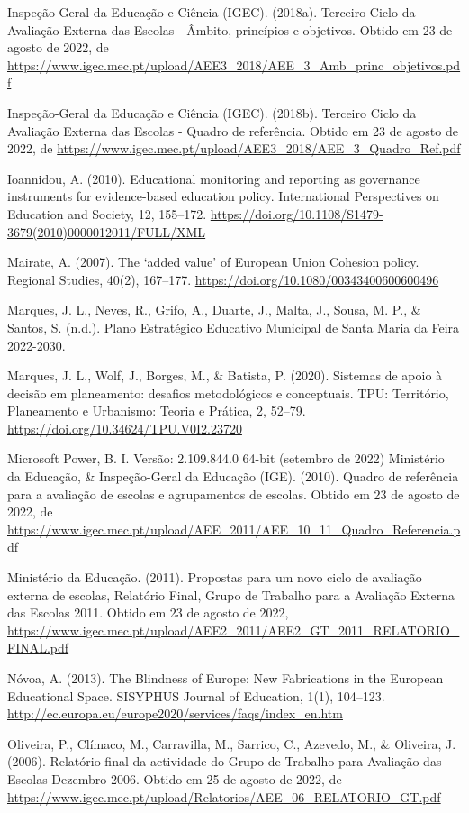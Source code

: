 \documentclass[
]{book}
\begin{document}
Inspeção-Geral da Educação e Ciência (IGEC). (2018a). Terceiro Ciclo da Avaliação Externa das Escolas - Âmbito, princípios e objetivos. Obtido em 23 de agosto de 2022, de \url{https://www.igec.mec.pt/upload/AEE3_2018/AEE_3_Amb_princ_objetivos.pdf}

Inspeção-Geral da Educação e Ciência (IGEC). (2018b). Terceiro Ciclo da Avaliação Externa das Escolas - Quadro de referência. Obtido em 23 de agosto de 2022, de \url{https://www.igec.mec.pt/upload/AEE3_2018/AEE_3_Quadro_Ref.pdf}

Ioannidou, A. (2010). Educational monitoring and reporting as governance instruments for evidence-based education policy. International Perspectives on Education and Society, 12, 155--172. \url{https://doi.org/10.1108/S1479-3679(2010)0000012011/FULL/XML}

Mairate, A. (2007). The `added value' of European Union Cohesion policy. Regional Studies, 40(2), 167--177. \url{https://doi.org/10.1080/00343400600600496}

Marques, J. L., Neves, R., Grifo, A., Duarte, J., Malta, J., Sousa, M. P., \& Santos, S. (n.d.). Plano Estratégico Educativo Municipal de Santa Maria da Feira 2022-2030.

Marques, J. L., Wolf, J., Borges, M., \& Batista, P. (2020). Sistemas de apoio à decisão em planeamento: desafios metodológicos e conceptuais. TPU: Território, Planeamento e Urbanismo: Teoria e Prática, 2, 52--79. \url{https://doi.org/10.34624/TPU.V0I2.23720}

Microsoft Power, B. I. Versão: 2.109.844.0 64-bit (setembro de 2022)
Ministério da Educação, \& Inspeção-Geral da Educação (IGE). (2010). Quadro de referência para a avaliação de escolas e agrupamentos de escolas. Obtido em 23 de agosto de 2022, de \url{https://www.igec.mec.pt/upload/AEE_2011/AEE_10_11_Quadro_Referencia.pdf}

Ministério da Educação. (2011). Propostas para um novo ciclo de avaliação externa de escolas, Relatório Final, Grupo de Trabalho para a Avaliação Externa das Escolas 2011. Obtido em 23 de agosto de 2022, \url{https://www.igec.mec.pt/upload/AEE2_2011/AEE2_GT_2011_RELATORIO_FINAL.pdf}

Nóvoa, A. (2013). The Blindness of Europe: New Fabrications in the European Educational Space. SISYPHUS Journal of Education, 1(1), 104--123. \url{http://ec.europa.eu/europe2020/services/faqs/index_en.htm}

Oliveira, P., Clímaco, M., Carravilla, M., Sarrico, C., Azevedo, M., \& Oliveira, J. (2006). Relatório final da actividade do Grupo de Trabalho para Avaliação das Escolas Dezembro 2006. Obtido em 25 de agosto de 2022, de \url{https://www.igec.mec.pt/upload/Relatorios/AEE_06_RELATORIO_GT.pdf}
\end{document}
